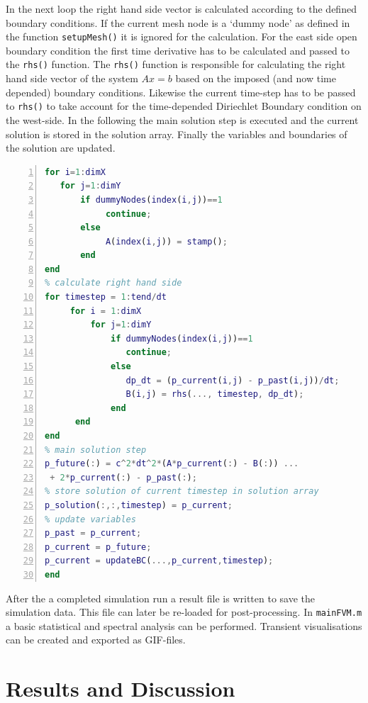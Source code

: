 \documentclass[fleqn,12pt]{NTFD} %
\begin{document}
 In the next loop the right hand side vector is calculated according to the defined boundary conditions. If the current mesh node is a `dummy node' as defined in the function \texttt{setupMesh()} it is ignored for the calculation.
For the east side open boundary condition the first time derivative has to be calculated and passed to the \texttt{rhs()} function. The \texttt{rhs()} function is responsible for calculating the right hand side vector of the system $Ax=b$ based on the imposed (and now time depended) boundary conditions. Likewise the current time-step has to be passed to \texttt{rhs()} to take account for the time-depended Diriechlet Boundary condition on the west-side. In the following the main solution step is executed and the current solution is stored in the solution array. Finally the variables and boundaries of the solution are updated.

 \begin{lstlisting}[language=Matlab, numbers=left, frame = single, caption= Pseudo-Matlab code for the main solver loop, captionpos=b, commentstyle=\color{gray}, stringstyle=\color{cayan}, label={lst:adaptercode}] 
% set up coefficient matrix A
for i=1:dimX
   for j=1:dimY
       if dummyNodes(index(i,j))==1
            continue;
       else
            A(index(i,j)) = stamp();
       end
end  
% calculate right hand side
for timestep = 1:tend/dt
     for i = 1:dimX
         for j=1:dimY
             if dummyNodes(index(i,j))==1
                continue;
             else
                dp_dt = (p_current(i,j) - p_past(i,j))/dt;
                B(i,j) = rhs(..., timestep, dp_dt);
             end
      end
end
% main solution step
p_future(:) = c^2*dt^2*(A*p_current(:) - B(:)) ...
 + 2*p_current(:) - p_past(:);
% store solution of current timestep in solution array
p_solution(:,:,timestep) = p_current;
% update variables
p_past = p_current;
p_current = p_future;
p_current = updateBC(...,p_current,timestep);
end
 \end{lstlisting}

After the a completed simulation run a result file  is written to save the simulation data. This file can later be re-loaded for post-processing. In \texttt{mainFVM.m} a basic statistical and spectral analysis can be performed. Transient visualisations can be created and exported as GIF-files.





\section{Results and Discussion}
\end{document}
